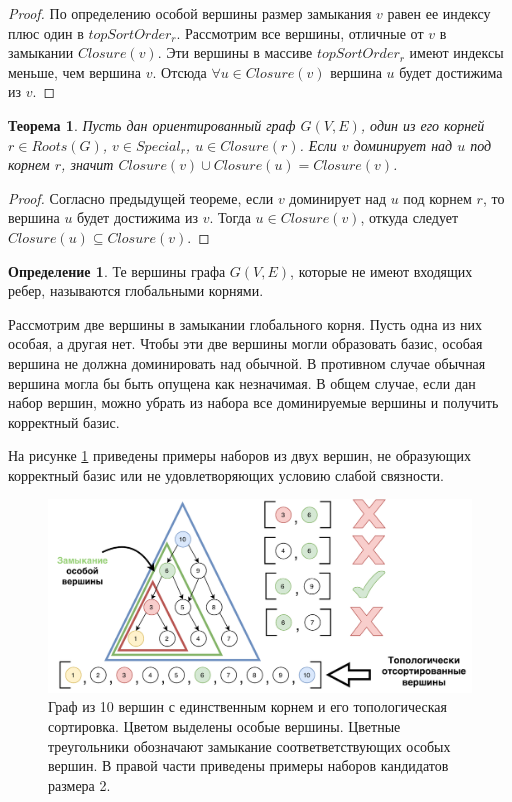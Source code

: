 \documentclass[12pt,a4paper,oneside,openany]{article}
\newtheorem{theorem}{Теорема}
\theoremstyle{definition}
\newtheorem{definition}{Определение}[]
\theoremstyle{lemma}
\theoremstyle{remark}
\begin{document}
\begin{proof}
По определению особой вершины размер замыкания $v$ равен ее индексу плюс один в $topSortOrder_r$.
Рассмотрим все вершины, отличные от $v$ в замыкании $Closure(v)$.
Эти вершины в массиве $topSortOrder_r$ имеют индексы меньше, чем вершина $v$.
Отсюда $\forall u \in Closure(v)$ вершина $u$ будет достижима из $v$.
\end{proof}

\begin{theorem}
Пусть дан ориентированный граф $G(V,E)$, один из его корней $r \in Roots(G)$,
$v \in Special_r$, $u \in Closure(r)$.
Если $v$ доминирует над $u$ под корнем $r$, значит $Closure(v) \cup Closure(u) = Closure(v)$.
\end{theorem}

\begin{proof}
Согласно предыдущей теореме, если $v$ доминирует над $u$ под корнем $r$,
то вершина $u$ будет достижима из $v$.
Тогда $u \in Closure(v)$, откуда следует $Closure(u) \subseteq Closure(v)$.
\end{proof}

\begin{definition}
Те вершины графа $G(V,E)$, которые не имеют входящих ребер, называются глобальными корнями.
\end{definition}

Рассмотрим две вершины в замыкании глобального корня.
Пусть одна из них особая, а другая нет.
Чтобы эти две вершины могли образовать базис, особая вершина не должна доминировать над обычной.
В противном случае обычная вершина могла бы быть опущена как незначимая.
В общем случае, если дан набор вершин, можно убрать из набора все доминируемые вершины и получить корректный базис.

На рисунке \ref{fig:candidatesfiltering} приведены примеры наборов из двух вершин, не образующих корректный базис
или не удовлетворяющих условию слабой связности.

\begin{figure}[H]
      \centering
      \includegraphics[width=1.0\linewidth]{images/candidates_filtering.pdf}
      \caption{Граф из 10 вершин с единственным корнем и его топологическая сортировка. Цветом выделены особые вершины.
Цветные треугольники обозначают замыкание соответветствующих особых вершин. В правой части приведены примеры наборов кандидатов размера 2.}
      \label{fig:candidatesfiltering}
\end{figure}
\end{document}
